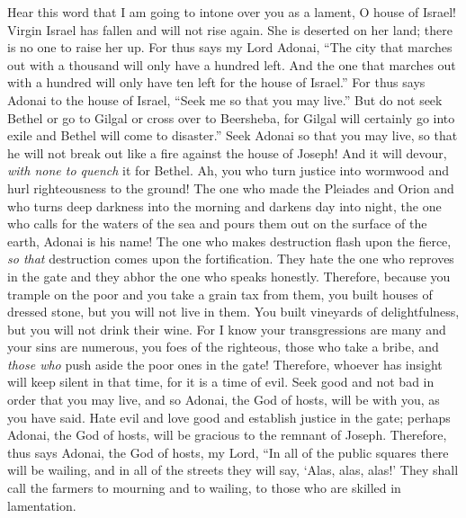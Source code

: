 \begin{biblechapter} %
 Hear this word that I am going to intone over you as a lament, O house of Israel!
\verse Virgin Israel has fallen and will not rise again. She is deserted on her land; there is no one to raise her up.
\verse For thus says my Lord Adonai, “The city that marches out with a thousand will only have a hundred left. And the one that marches out with a hundred will only have ten left for the house of Israel.”
\verse For thus says Adonai to the house of Israel, “Seek me so that you may live.”
\verse But do not seek Bethel or go to Gilgal or cross over to Beersheba, for Gilgal will certainly go into exile and Bethel will come to disaster.”
\verse Seek Adonai so that you may live, so that he will not break out like a fire against the house of Joseph! And it will devour, \textit{with none to quench} it for Bethel.
\verse Ah, you who turn justice into wormwood and hurl righteousness to the ground!
\verse The one who made the Pleiades and Orion and who turns deep darkness into the morning and darkens day into night, the one who calls for the waters of the sea and pours them out on the surface of the earth, Adonai is his name!
\verse The one who makes destruction flash upon the fierce, \textit{so that} destruction comes upon the fortification.
\verse They hate the one who reproves in the gate and they abhor the one who speaks honestly.
\verse Therefore, because you trample on the poor and you take a grain tax from them, you built houses of dressed stone, but you will not live in them. You built vineyards of delightfulness, but you will not drink their wine.
\verse For I know your transgressions are many and your sins are numerous, you foes of the righteous, those who take a bribe, and \textit{those who} push aside the poor ones in the gate!
\verse Therefore, whoever has insight will keep silent in that time, for it is a time of evil.
\verse Seek good and not bad in order that you may live, and so Adonai, the God of hosts, will be with you, as you have said.
\verse Hate evil and love good and establish justice in the gate; perhaps Adonai, the God of hosts, will be gracious to the remnant of Joseph.
\verse Therefore, thus says Adonai, the God of hosts, my Lord, “In all of the public squares there will be wailing, and in all of the streets they will say, ‘Alas, alas, alas!’ They shall call the farmers to mourning and to wailing, to those who are skilled in lamentation.

\end{biblechapter}
